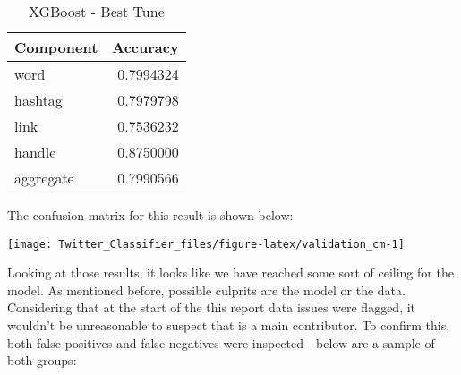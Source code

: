 \documentclass[11pt,]{article}
\begin{document}
\begin{table}[H]

\caption{\label{tab:validation_results}XGBoost - Best Tune}
\centering
\begin{tabular}[t]{lr}
\toprule
Component & Accuracy\\
\midrule
\rowcolor{gray!6}  word & 0.7994324\\
hashtag & 0.7979798\\
\rowcolor{gray!6}  link & 0.7536232\\
handle & 0.8750000\\
\rowcolor{gray!6}  aggregate & 0.7990566\\
\bottomrule
\end{tabular}
\end{table}

The confusion matrix for this result is shown below:

\begin{center}\texttt{[image: Twitter\_Classifier\_files/figure-latex/validation\_cm-1]} \end{center}

Looking at those results, it looks like we have reached some sort of
ceiling for the model. As mentioned before, possible culprits are the
model or the data. Considering that at the start of the this report data
issues were flagged, it wouldn't be unreasonable to suspect that is a
main contributor. To confirm this, both false positives and false
negatives were inspected - below are a sample of both groups:
\end{document}
